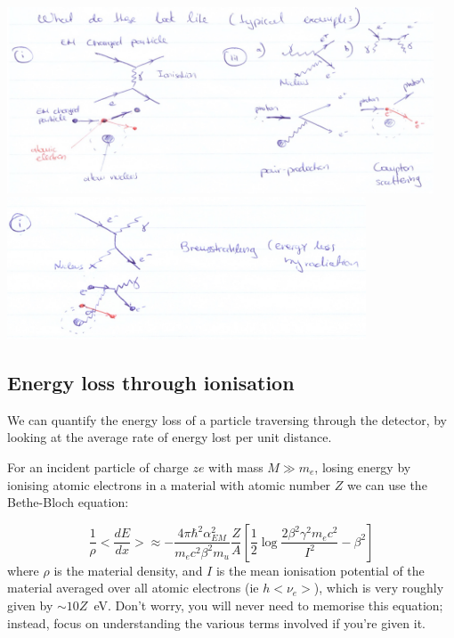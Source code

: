 \begin{center}
\includegraphics[width=0.95\textwidth]{fig/strongforce/matterinteractions/interactions1.jpg}\newline
\includegraphics[width=0.8\textwidth]{fig/strongforce/matterinteractions/interactions2.jpg}
\end{center}

\subsection{Energy loss through ionisation}
We can quantify the energy loss of a particle traversing through the detector, by looking at the average rate of energy lost per unit distance.


For an incident particle of charge $ze$ with mass $M\gg m_e$, losing energy by ionising atomic electrons in a material with atomic number $Z$ we can use the Bethe-Bloch equation:

\begin{equation}
\label{eq:bethebloch}
\frac{1}{\rho}<\frac{dE}{dx}>\approx -\frac{4\pi\hbar^2\alpha_{EM}^{2}}{m_ec^2\beta^2m_u}\frac{Z}{A}\left[\frac{1}{2}\log\frac{2\beta^2\gamma^2m_ec^2}{I^2}-\beta^2\right]
\end{equation}
where $\rho$ is the material density, and $I$ is the mean ionisation potential of the material averaged over all atomic electrons (ie $h<\nu_e>$), which is very roughly given by $\sim 10Z$~eV. Don't worry, you will never need to memorise this equation; instead, focus on understanding the various terms involved if you're given it.
 
